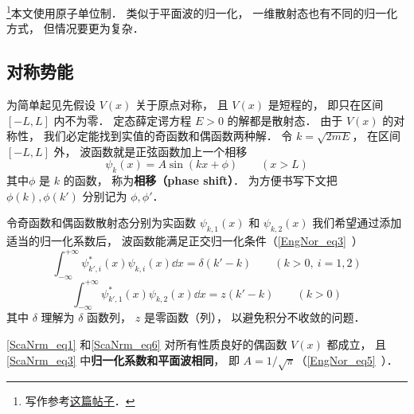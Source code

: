 
\begin{issues}
\issueDraft
{}
\end{issues}

\footnote{写作参考\href{https://chaoli.club/index.php/4541/last}{这篇帖子}．}本文使用原子单位制． 类似于平面波的归一化， 一维散射态也有不同的归一化方式， 但情况要更为复杂． 
\subsection{对称势能}
为简单起见先假设 $V(x)$ 关于原点对称， 且 $V(x)$ 是短程的， 即只在区间 $[-L,L]$ 内不为零． 定态薛定谔方程 $E > 0$ 的解都是散射态． 由于 $V(x)$ 的对称性， 我们必定能找到实值的奇函数和偶函数两种解． 令 $k = \sqrt{2mE}$， 在区间 $[-L,L]$ 外， 波函数就是正弦函数加上一个相移
\begin{equation}\label{ScaNrm_eq3}
\psi_k(x) = A\sin(kx + \phi) \qquad (x > L)
\end{equation}
其中$\phi$ 是 $k$ 的函数， 称为\textbf{相移（phase shift）}． 为方便书写下文把 $\phi(k),\phi(k')$ 分别记为 $\phi, \phi'$．

令奇函数和偶函数散射态分别为实函数 $\psi_{k,1}(x)$ 和 $\psi_{k,2}(x)$ 我们希望通过添加适当的归一化系数后， 波函数能满足正交归一化条件（\autoref{EngNor_eq3}~）
\begin{equation}\label{ScaNrm_eq1}
\int_{-\infty}^{+\infty} \psi_{k',i}^*(x) \psi_{k,i}(x) \dd{x} = \delta(k' - k) \qquad (k > 0,\ i = 1, 2)
\end{equation}
\begin{equation}\label{ScaNrm_eq6}
\int_{-\infty}^{+\infty} \psi_{k',1}^*(x) \psi_{k,2}(x) \dd{x} = z(k' - k) \qquad (k > 0)
\end{equation}
其中 $\delta$ 理解为 $\delta$ 函数列， $z$ 是零函数（列）， 以避免积分不收敛的问题．

\begin{theorem}{}\label{ScaNrm_the1}
\autoref{ScaNrm_eq1} 和\autoref{ScaNrm_eq6} 对所有性质良好的偶函数 $V(x)$ 都成立， 且\autoref{ScaNrm_eq3} 中\textbf{归一化系数和平面波相同}， 即 $A = 1/\sqrt{\pi}$（\autoref{EngNor_eq5}~）．
\end{theorem}

